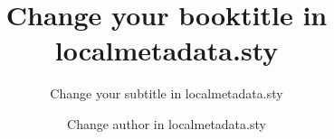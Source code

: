 

\title{Change your booktitle in localmetadata.sty}  %
\subtitle{Change your subtitle in  localmetadata.sty}
\dedication{Change dedication in localmetadata.sty}
\author{Change author in localmetadata.sty}
\renewcommand{\lsISBN}{978-3-000000-00-0}                     
\renewcommand{\lsSeries}{dummyseries} %
\renewcommand{\lsSeriesNumber}{99} %
\renewcommand{\lsURL}{http://langsci-press.org/catalog/book/0} %
